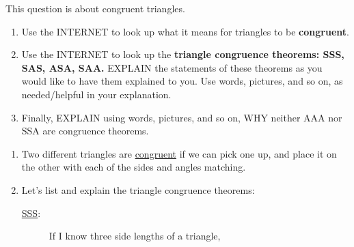 \documentclass[noauthor,nooutcomes]{ximera}
\begin{document}
\begin{question} This question is about congruent triangles.
  \begin{enumerate}
  \item Use the INTERNET to look up what it means for triangles to be
  \textbf{congruent}.
  \item Use the INTERNET to look up the \textbf{triangle congruence
    theorems: SSS, SAS, ASA, SAA.} EXPLAIN the statements of these
    theorems as you would like to have them explained to you. Use
    words, pictures, and so on, as needed/helpful in your explanation.
  \item Finally, EXPLAIN using words, pictures, and so on, WHY neither AAA
  nor SSA are congruence theorems.
  \end{enumerate}

  \begin{freeResponse}
    \begin{enumerate}
    \item Two different triangles are \underline{congruent} if we can pick one up,
      and place it on the other with each of the sides and angles
      matching.

    \item Let's list and explain the triangle congruence theorems:
    \begin{description}
    \item[\bsifamily\underline{SSS}:] If I know three side lengths
      of a triangle,
      \begin{center}
\end{center}
\end{description}
\end{enumerate}
\end{freeResponse}
\end{question}
\end{document}
